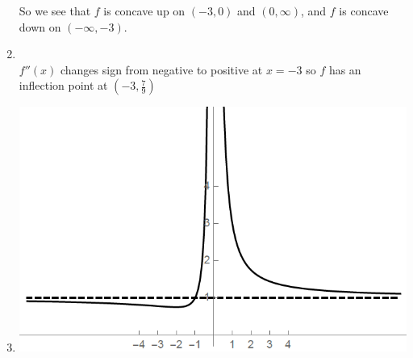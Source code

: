 \documentclass[nooutcomes]{ximera}
\begin{document}
\begin{problem}
\begin{freeResponse}
\begin{enumerate}
       So we see that $f$ is concave up on $(-3,0)$ and $(0,\infty)$, and $f$ is concave down on $(-\infty, -3)$.
     \item
         \\
       $f''(x)$ changes sign from negative to positive at $x=-3$ so $f$ has an inflection point at $\left( -3, \frac{7}{9} \right)$
			
     \item
       \begin{image}
         \includegraphics[scale=.5]{Figure6.png}
       \end{image}

    \end{enumerate}
  \end{freeResponse}
\end{problem}
\end{document}
